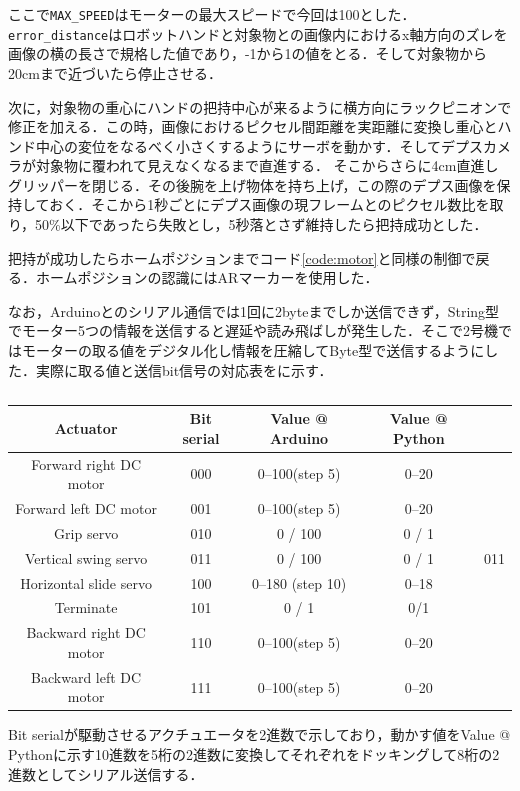 ここで\texttt{MAX\_SPEED}はモーターの最大スピードで今回は100とした．\texttt{error\_distance}はロボットハンドと対象物との画像内におけるx軸方向のズレを画像の横の長さで規格した値であり，-1から1の値をとる．そして対象物から20cmまで近づいたら停止させる．

次に，対象物の重心にハンドの把持中心が来るように横方向にラックピニオンで修正を加える．この時，画像におけるピクセル間距離を実距離に変換し重心とハンド中心の変位をなるべく小さくするようにサーボを動かす．そしてデプスカメラが対象物に覆われて見えなくなるまで直進する．
そこからさらに4cm直進しグリッパーを閉じる．その後腕を上げ物体を持ち上げ，この際のデプス画像を保持しておく．そこから1秒ごとにデプス画像の現フレームとのピクセル数比を取り，50\%以下であったら失敗とし，5秒落とさず維持したら把持成功とした．

把持が成功したらホームポジションまでコード\ref{code:motor}と同様の制御で戻る．ホームポジションの認識にはARマーカーを使用した．

なお，Arduinoとのシリアル通信では1回に2byteまでしか送信できず，String型でモーター5つの情報を送信すると遅延や読み飛ばしが発生した．そこで2号機ではモーターの取る値をデジタル化し情報を圧縮してByte型で送信するようにした．実際に取る値と送信bit信号の対応表をに示す．

\begin{table}
    \centering
    \caption{}
    \begin{tabular}{cccc}\toprule
        Actuator & Bit serial & Value @ Arduino & Value @ Python \\ \midrule
        Forward right DC motor & 000 & 0--100(step 5) & 0--20  \\ 
        Forward left DC motor & 001 & 0--100(step 5) & 0--20 \\ 
        Grip servo & 010 & 0 / 100 & 0 / 1\\ 
        Vertical swing servo & 011 & 0 / 100 & 0 / 1 & 011 \\ 
        Horizontal slide servo & 100 & 0--180 (step 10) & 0--18 \\ 
        Terminate & 101 & 0 / 1 & 0/1 \\ 
        Backward right DC motor & 110 & 0--100(step 5) & 0--20 \\ 
        Backward left DC motor & 111 & 0--100(step 5) & 0--20 \\ \bottomrule
    \end{tabular} 
    \label{tab:2号機信号表}
\end{table}

Bit serialが駆動させるアクチュエータを2進数で示しており，動かす値をValue @ Pythonに示す10進数を5桁の2進数に変換してそれぞれをドッキングして8桁の2進数としてシリアル送信する．


